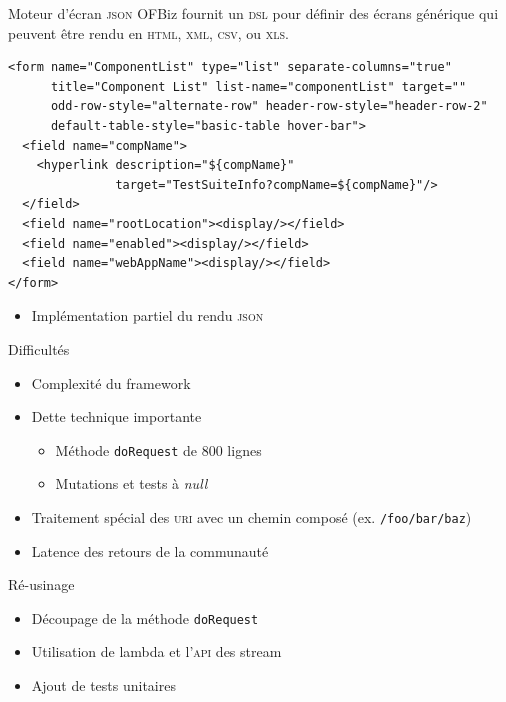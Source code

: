 \documentclass{beamer}
\begin{document}
\begin{frame}[fragile]{Moteur d'écran \textsc{json}}
  OFBiz fournit un \textsc{dsl} pour définir des écrans générique qui
  peuvent être rendu en \textsc{html}, \textsc{xml}, \textsc{csv}, ou
  \textsc{xls}.

  \begin{center}
    \scriptsize
\begin{verbatim}
<form name="ComponentList" type="list" separate-columns="true"
      title="Component List" list-name="componentList" target=""
      odd-row-style="alternate-row" header-row-style="header-row-2"
      default-table-style="basic-table hover-bar">
  <field name="compName">
    <hyperlink description="${compName}"
               target="TestSuiteInfo?compName=${compName}"/>
  </field>
  <field name="rootLocation"><display/></field>
  <field name="enabled"><display/></field>
  <field name="webAppName"><display/></field>
</form>
\end{verbatim}
  \end{center}

  \begin{itemize}
  \item Implémentation partiel du rendu \textsc{json}
  \end{itemize}
\end{frame}

\begin{frame}{Difficultés}
  \begin{itemize}
  \item Complexité du framework
  \item Dette technique importante
    \begin{itemize}
    \item Méthode \texttt{doRequest} de 800 lignes
    \item Mutations et tests à \emph{null}
    \end{itemize}
  \item Traitement spécial des \textsc{uri} avec un chemin composé
    (ex. \texttt{/foo/bar/baz})
  \item Latence des retours de la communauté
  \end{itemize}
\end{frame}

\begin{frame}{Ré-usinage}
  \begin{itemize}
  \item Découpage de la méthode \texttt{doRequest}
  \item Utilisation de lambda et l'\textsc{api} des stream
  \item Ajout de tests unitaires
  \end{itemize}
\end{frame}
\end{document}
